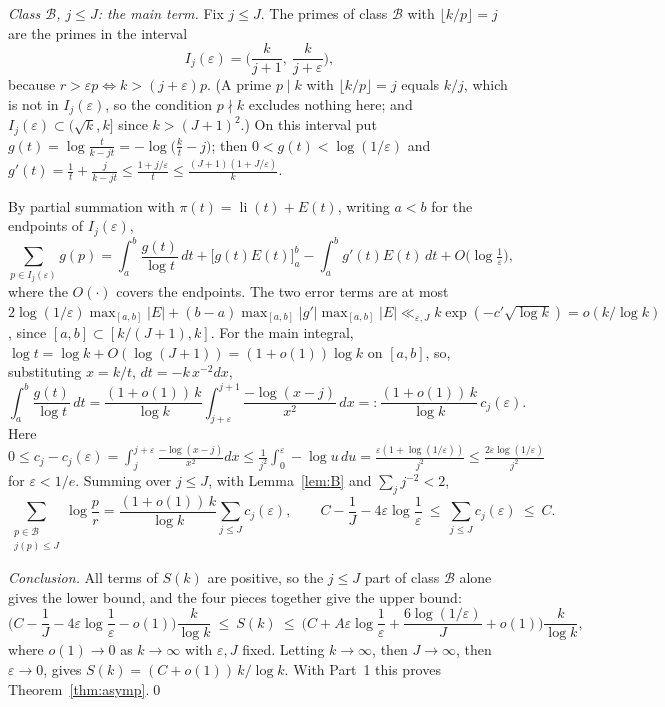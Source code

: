 \documentclass[11pt]{amsart}
\theoremstyle{remark}
\begin{document}
\emph{Class $\mathcal B$, $j\le J$: the main term.} Fix $j\le J$. The primes of class $\mathcal B$ with $\lfloor k/p\rfloor=j$ are the primes in the interval
\[I_j(\varepsilon)=\Big(\frac k{j+1},\ \frac k{j+\varepsilon}\Big),\]
because $r>\varepsilon p\iff k>(j+\varepsilon)p$. (A prime $p\mid k$ with $\lfloor k/p\rfloor=j$ equals $k/j$, which is not in $I_j(\varepsilon)$, so the condition $p\nmid k$ excludes nothing here; and $I_j(\varepsilon)\subset(\sqrt k,k]$ since $k>(J+1)^2$.) On this interval put $g(t)=\log\frac{t}{k-jt}=-\log\big(\frac kt-j\big)$; then $0<g(t)<\log(1/\varepsilon)$ and $g'(t)=\frac1t+\frac j{k-jt}\le\frac{1+j/\varepsilon}t\le\frac{(J+1)(1+J/\varepsilon)}k$.

By partial summation with $\pi(t)=\operatorname{li}(t)+E(t)$, writing $a<b$ for the endpoints of $I_j(\varepsilon)$,
\[\sum_{p\in I_j(\varepsilon)}g(p)=\int_a^b\frac{g(t)}{\log t}\,dt+\big[g(t)E(t)\big]_a^b-\int_a^bg'(t)E(t)\,dt+O\big(\log\tfrac1\varepsilon\big),\]
where the $O(\cdot)$ covers the endpoints. The two error terms are at most $2\log(1/\varepsilon)\max_{[a,b]}|E|+(b-a)\max_{[a,b]}|g'|\max_{[a,b]}|E|\ll_{\varepsilon,J}k\exp(-c'\sqrt{\log k})=o(k/\log k)$, since $[a,b]\subset[k/(J+1),k]$. For the main integral, $\log t=\log k+O(\log(J+1))=(1+o(1))\log k$ on $[a,b]$, so, substituting $x=k/t$, $dt=-k\,x^{-2}dx$,
\[\int_a^b\frac{g(t)}{\log t}\,dt=\frac{(1+o(1))\,k}{\log k}\int_{j+\varepsilon}^{j+1}\frac{-\log(x-j)}{x^2}\,dx=:\frac{(1+o(1))\,k}{\log k}\,c_j(\varepsilon).\]
Here $0\le c_j-c_j(\varepsilon)=\int_j^{j+\varepsilon}\frac{-\log(x-j)}{x^2}dx\le\frac1{j^2}\int_0^\varepsilon-\log u\,du=\frac{\varepsilon(1+\log(1/\varepsilon))}{j^2}\le\frac{2\varepsilon\log(1/\varepsilon)}{j^2}$ for $\varepsilon<1/e$. Summing over $j\le J$, with Lemma~\ref{lem:B} and $\sum_jj^{-2}<2$,
\[\sum_{\substack{p\in\mathcal B\\j(p)\le J}}\log\frac pr=\frac{(1+o(1))\,k}{\log k}\sum_{j\le J}c_j(\varepsilon),\qquad C-\frac1J-4\varepsilon\log\frac1\varepsilon\ \le\ \sum_{j\le J}c_j(\varepsilon)\ \le\ C.\]

\emph{Conclusion.} All terms of $S(k)$ are positive, so the $j\le J$ part of class $\mathcal B$ alone gives the lower bound, and the four pieces together give the upper bound:
\[\Big(C-\frac1J-4\varepsilon\log\frac1\varepsilon-o(1)\Big)\frac k{\log k}\ \le\ S(k)\ \le\ \Big(C+A\varepsilon\log\frac1\varepsilon+\frac{6\log(1/\varepsilon)}J+o(1)\Big)\frac k{\log k},\]
where $o(1)\to0$ as $k\to\infty$ with $\varepsilon,J$ fixed. Letting $k\to\infty$, then $J\to\infty$, then $\varepsilon\to0$, gives $S(k)=(C+o(1))\,k/\log k$. With Part~1 this proves Theorem~\ref{thm:asymp}.\qed
\end{document}
